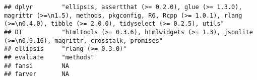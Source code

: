 \documentclass[]{book}
\begin{document}
\begin{verbatim}
## dplyr        "ellipsis, assertthat (>= 0.2.0), glue (>= 1.3.0), magrittr (>=\n1.5), methods, pkgconfig, R6, Rcpp (>= 1.0.1), rlang (>=\n0.4.0), tibble (>= 2.0.0), tidyselect (>= 0.2.5), utils"                                                                                                                                                                                                                                                                                                                         
## DT           "htmltools (>= 0.3.6), htmlwidgets (>= 1.3), jsonlite (>=\n0.9.16), magrittr, crosstalk, promises"                                                                                                                                                                                                                                                                                                                                                                                                          
## ellipsis     "rlang (>= 0.3.0)"                                                                                                                                                                                                                                                                                                                                                                                                                                                                                          
## evaluate     "methods"                                                                                                                                                                                                                                                                                                                                                                                                                                                                                                   
## fansi        NA                                                                                                                                                                                                                                                                                                                                                                                                                                                                                                          
## farver       NA                                                                                                                                                                                                                                                                                                                                                                                                                                                                                                          

\end{verbatim}
\end{document}
